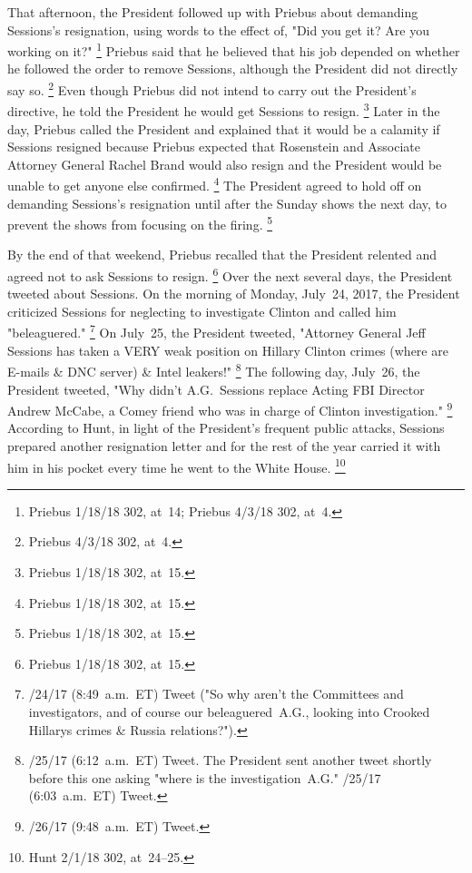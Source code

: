 That afternoon, the President followed up with Priebus about demanding Sessions's resignation, using words to the effect of, "Did you get it?
Are you working on it?"%
\footnote{Priebus 1/18/18 302, at~14;
Priebus 4/3/18 302, at~4.}
Priebus said that he believed that his job depended on whether he followed the order to remove Sessions, although the President did not directly say so.%
\footnote{Priebus 4/3/18 302, at~4.}
Even though Priebus did not intend to carry out the President's directive, he told the President he would get Sessions to resign.%
\footnote{Priebus 1/18/18 302, at~15.}
Later in the day, Priebus called the President and explained that it would be a calamity if Sessions resigned because Priebus expected that Rosenstein and Associate Attorney General Rachel Brand would also resign and the President would be unable to get anyone else confirmed.%
\footnote{Priebus 1/18/18 302, at~15.}
The President agreed to hold off on demanding Sessions's resignation until after the Sunday shows the next day, to prevent the shows from focusing on the firing.%
\footnote{Priebus 1/18/18 302, at~15.}

By the end of that weekend, Priebus recalled that the President relented and agreed not to ask Sessions to resign.%
\footnote{Priebus 1/18/18 302, at~15.}
Over the next several days, the President tweeted about Sessions.
On the morning of Monday, July~24, 2017, the President criticized Sessions for neglecting to investigate Clinton and called him "beleaguered."%
\footnote{/24/17 (8:49~a.m.~ET) Tweet ("So why aren't the Committees and investigators, and of course our beleaguered~A.G., looking into Crooked Hillarys crimes \& Russia relations?").}
On July~25, the President tweeted, "Attorney General Jeff Sessions has taken a VERY weak position on Hillary Clinton crimes (where are E-mails \& DNC server) \& Intel leakers!"%
\footnote{/25/17 (6:12~a.m.~ET) Tweet.
The President sent another tweet shortly before this one asking "where is the investigation~A.G."
/25/17 (6:03~a.m.~ET) Tweet.}
The following day, July~26, the President tweeted, "Why didn't A.G.~Sessions replace Acting FBI Director Andrew McCabe, a Comey friend who was in charge of Clinton investigation."%
\footnote{/26/17 (9:48~a.m.~ET) Tweet.}
According to Hunt, in light of the President's frequent public attacks, Sessions prepared another resignation letter and for the rest of the year carried it with him in his pocket every time he went to the White House.%
\footnote{Hunt 2/1/18 302, at~24--25.}

